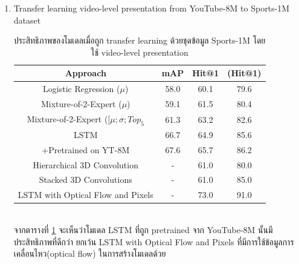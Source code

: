 \begin{enumerate}
\begin{enumerate}
\\
\\
		 LSTM นั้นดีที่สุดยกเว้น mAP, เนื่องจาก one-vs-all binary MoE classifier นั้นมีประสิทธิภาพดีกว่า, LSTM สามารถเพิ่มประสิทธิภาพบน Hit@1 และ PERR ได้เนื่องจากความสามารถในการเรียนรู้ความสัมพันธ์ระยะยาวในโดเมนของเวลา
		\clearpage
		\item Transfer learning video-level presentation from YouTube-8M to Sports-1M dataset
\begin{table}[!ht]
\centering
\begin{tabular}{|c|c|c|c|}
		\hline
		{Approach}&{mAP}&{Hit@1}&{(Hit@1)}\\
		\hline
		Logistic Regression ($\mu$)					& 58.0		& 60.1		& 79.6					\\
		Mixture-of-2-Expert ($\mu$)					& 59.1		& 61.5		& 80.4					\\
		Mixture-of-2-Expert ([$\mu ; \sigma ; Top_{5}$		& 61.3		& 63.2		& 82.6					\\
		LSTM									& 66.7		& 64.9		& 85.6					\\
		+Pretrained on YT-8M							& 67.6		& 65.7		& 86.2					\\
		\hline
		Hierarchical 3D Convolution						& -			& 61.0		& 80.0					\\
		Stacked 3D Convolutions						& -			& 61.0		& 85.0					\\
		LSTM with Optical Flow and Pixels				& -			& 73.0		& 91.0					\\
		\hline
	\end{tabular}
	\caption{ประสิทธิภาพของโมเดลเมื่อถูก transfer learning ด้วยชุดข้อมูล Sports-1M โดยใช้ video-level presentation}
	\label{tab: transfer learning}
\end{table}
\\
		จากตารางที่  \ref{tab: transfer learning} จะเห็นว่าโมเดล LSTM ที่ถูก pretrained จาก YouTube-8M นั้นมีประสิทธิภาพที่ดีกว่า ยกเว้น LSTM with Optical Flow and Pixels ที่มีการใช้ข้อมูลการเคลื่อนไหว(optical flow) ในการสร้างโมเดลด้วย
\\
		

\end{enumerate}
\end{enumerate}
